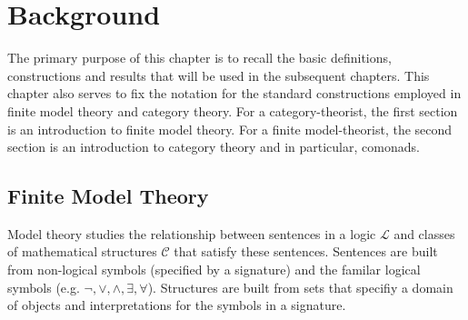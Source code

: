 \chapter{Background}
The primary purpose of this chapter is to recall the basic definitions, constructions and results that will be used in the subsequent chapters. This chapter also serves to fix the notation for the standard constructions employed in finite model theory and category theory. For a category-theorist, the first section is an introduction to finite model theory. For a finite model-theorist, the second section is an introduction to category theory and in particular, comonads.   
\section{Finite Model Theory}
Model theory studies the relationship between sentences in a logic $\mathcal{L}$ and classes of mathematical structures $\mathcal{C}$ that satisfy these sentences. Sentences are built from non-logical symbols (specified by a signature) and the familar logical symbols (e.g. $\neg,\vee,\wedge,\exists,\forall$). Structures are built from sets that specifiy a domain of objects and interpretations for the symbols in a signature.

